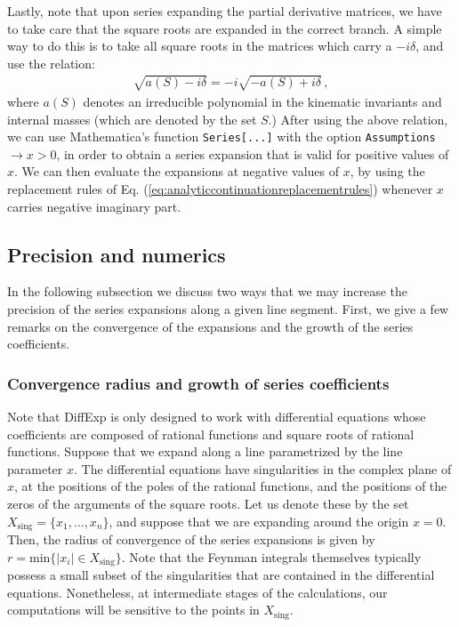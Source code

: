 \documentclass{article}
\begin{document}
Lastly, note that upon series expanding the partial derivative matrices, we have to take care that the square roots are expanded in the correct branch. A simple way to do this is to take all square roots in the matrices which carry a $-i\delta$, and use the relation:
\begin{align}
    \sqrt{a(S)-i\delta} = -i\sqrt{-a(S)+i\delta}\,,
\end{align}
where $a(S)$ denotes an irreducible polynomial in the kinematic invariants and internal masses (which are denoted by the set $S$.) After using the above relation, we can use Mathematica's function \texttt{Series[...]} with the option \texttt{Assumptions $\rightarrow x>0$}, in order to obtain a series expansion that is valid for positive values of $x$. We can then evaluate the expansions at negative values of $x$, by using the replacement rules of Eq. (\ref{eq:analyticcontinuationreplacementrules}) whenever $x$ carries negative imaginary part.

\subsection{Precision and numerics}
\label{sec:precisionandnumerics}
In the following subsection we discuss two ways that we may increase the precision of the series expansions along a given line segment. First, we give a few remarks on the convergence of the expansions and the growth of the series coefficients.

\subsubsection{Convergence radius and growth of series coefficients}
\label{sec:precisionandconvergence}
Note that DiffExp is only designed to work with differential equations whose coefficients are composed of rational functions and square roots of rational functions. Suppose that we expand along a line parametrized by the line parameter $x$. The differential equations have singularities in the complex plane of $x$, at the positions of the poles of the rational functions, and the positions of the zeros of the arguments of the square roots. Let us denote these by the set $X_\text{sing} = \{x_1,\ldots,x_n\}$, and suppose that we are expanding around the origin $x=0$. Then, the radius of convergence of the series expansions is given by $r=\text{min}\{|x_i| \in X_\text{sing}\}$. Note that the Feynman integrals themselves typically possess a small subset of the singularities that are contained in the differential equations. Nonetheless, at intermediate stages of the calculations, our computations will be sensitive to the points in $X_\text{sing}$.
\end{document}
